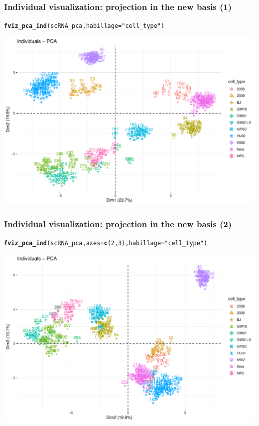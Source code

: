 \documentclass{beamer}\usepackage[]{graphicx}\usepackage[]{color}
\makeatletter
\newcommand{\hlnum}[1]{\textcolor[rgb]{0.686,0.059,0.569}{#1}}%
\newcommand{\hlstr}[1]{\textcolor[rgb]{0.192,0.494,0.8}{#1}}%
\newcommand{\hlstd}[1]{\textcolor[rgb]{0.345,0.345,0.345}{#1}}%
\newcommand{\hlkwc}[1]{\textcolor[rgb]{0.333,0.667,0.333}{#1}}%
\newcommand{\hlkwd}[1]{\textcolor[rgb]{0.737,0.353,0.396}{\textbf{#1}}}%
\newenvironment{kframe}{%
 \def\at@end@of@kframe{}%
 \ifinner\ifhmode%
  \def\at@end@of@kframe{\end{minipage}}%
  \begin{minipage}{\columnwidth}%
 \fi\fi%
 \def\FrameCommand##1{\hskip\@totalleftmargin \hskip-\fboxsep
 \colorbox{shadecolor}{##1}\hskip-\fboxsep
     \hskip-\linewidth \hskip-\@totalleftmargin \hskip\columnwidth}%
 \MakeFramed {\advance\hsize-\width
   \@totalleftmargin\z@ \linewidth\hsize
   \@setminipage}}%
 {\par\unskip\endMakeFramed%
 \at@end@of@kframe}
\newenvironment{knitrout}{}{} %
\makeatother
\begin{document}
\begin{frame}[fragile]
  \frametitle{Individual visualization: projection in the new basis (1)}

\begin{knitrout}\scriptsize
{}\color{fgcolor}\begin{kframe}
\begin{alltt}
\hlkwd{fviz_pca_ind}\hlstd{(scRNA_pca,} \hlkwc{habillage} \hlstd{=} \hlstr{"cell_type"}\hlstd{)}
\end{alltt}
\end{kframe}
\includegraphics[width=.8\textwidth]{figures/pca_crabs_indmap1-1} 
\end{knitrout}

\end{frame}

\begin{frame}[fragile]
  \frametitle{Individual visualization: projection in the new basis (2)}

\begin{knitrout}\scriptsize
{}\color{fgcolor}\begin{kframe}
\begin{alltt}
\hlkwd{fviz_pca_ind}\hlstd{(scRNA_pca,} \hlkwc{axes} \hlstd{=} \hlkwd{c}\hlstd{(}\hlnum{2}\hlstd{,}\hlnum{3}\hlstd{),} \hlkwc{habillage} \hlstd{=} \hlstr{"cell_type"}\hlstd{)}
\end{alltt}
\end{kframe}
\includegraphics[width=.8\textwidth]{figures/pca_crabs_indmap2-1} 
\end{knitrout}

\end{frame}
\end{document}
